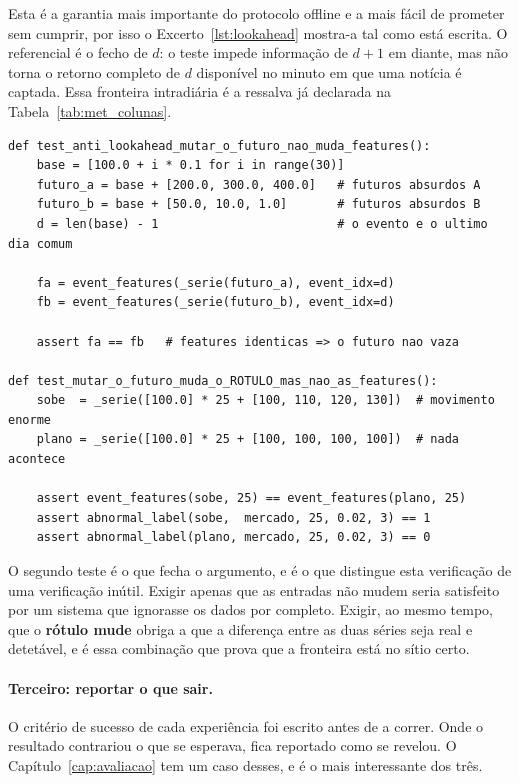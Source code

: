 Esta é a garantia mais importante do protocolo offline e a mais fácil de prometer sem cumprir, por
isso o Excerto~\ref{lst:lookahead} mostra-a tal como está escrita. O referencial é o fecho de $d$:
o teste impede informação de $d+1$ em diante, mas não torna o retorno completo de $d$ disponível no
minuto em que uma notícia é captada. Essa fronteira intradiária é a ressalva já declarada na
Tabela~\ref{tab:met_colunas}.

\begin{lstlisting}[label=lst:lookahead, caption={Os \textbf{dois} testes que impedem o futuro de entrar
nas entradas. O primeiro exige que duas séries com futuros diferentes dêem entradas iguais; o
segundo, que é o que fecha o argumento, exige ao mesmo tempo que o \emph{rótulo} mude.}]
def test_anti_lookahead_mutar_o_futuro_nao_muda_features():
    base = [100.0 + i * 0.1 for i in range(30)]
    futuro_a = base + [200.0, 300.0, 400.0]   # futuros absurdos A
    futuro_b = base + [50.0, 10.0, 1.0]       # futuros absurdos B
    d = len(base) - 1                         # o evento e o ultimo dia comum

    fa = event_features(_serie(futuro_a), event_idx=d)
    fb = event_features(_serie(futuro_b), event_idx=d)

    assert fa == fb   # features identicas => o futuro nao vaza

def test_mutar_o_futuro_muda_o_ROTULO_mas_nao_as_features():
    sobe  = _serie([100.0] * 25 + [100, 110, 120, 130])  # movimento enorme
    plano = _serie([100.0] * 25 + [100, 100, 100, 100])  # nada acontece

    assert event_features(sobe, 25) == event_features(plano, 25)
    assert abnormal_label(sobe,  mercado, 25, 0.02, 3) == 1
    assert abnormal_label(plano, mercado, 25, 0.02, 3) == 0
\end{lstlisting}

O segundo teste é o que fecha o argumento, e é o que distingue esta verificação de uma verificação
inútil. Exigir apenas que as entradas não mudem seria satisfeito por um sistema que
ignorasse os dados por completo. Exigir, ao mesmo tempo, que o \textbf{rótulo mude} obriga a que a
diferença entre as duas séries seja real e detetável, e é essa combinação que prova que a fronteira
está no sítio certo.

\paragraph{Terceiro: reportar o que sair.}
O critério de sucesso de cada experiência foi escrito antes de a correr. Onde o resultado contrariou
o que se esperava, fica reportado como se revelou. O Capítulo~\ref{cap:avaliacao} tem um caso desses,
e é o mais interessante dos três.


